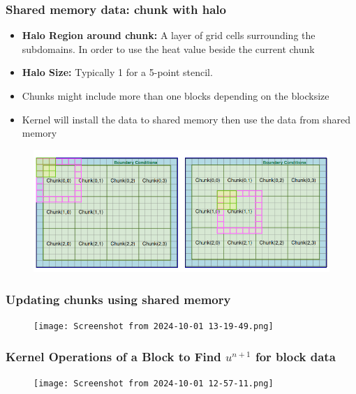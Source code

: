 \documentclass[9pt]{beamer}
\begin{document}
\begin{frame}
\frametitle{Shared memory data: chunk with halo}
\begin{itemize}
    \item \textbf{Halo Region around chunk:} A layer of grid cells surrounding the subdomains. In order to use the heat value beside the current chunk
    \item \textbf{Halo Size:} Typically 1 for a 5-point stencil.
    \item Chunks might include more than one blocks depending on the blocksize
    \item Kernel will install the data to shared memory then use the data from shared memory
\end{itemize}

\begin{figure}
    \centering
    \includegraphics[width=0.8\linewidth]{Screenshot from 2024-08-30 19-03-50.png}
    \label{fig:enter-label}
\end{figure}
\end{frame}

\begin{frame}
\frametitle{Updating chunks using shared memory}
\begin{figure}
    \centering
    \texttt{[image: Screenshot from 2024-10-01 13-19-49.png]}
    \label{fig:enter-label}
\end{figure}
\end{frame}

\begin{frame}
\frametitle{Kernel Operations of a Block to Find $u^{n+1}$ for block data}
\begin{figure}
    \centering
    \texttt{[image: Screenshot from 2024-10-01 12-57-11.png]}
    \label{fig:enter-label}
\end{figure}
\end{frame}
\end{document}
